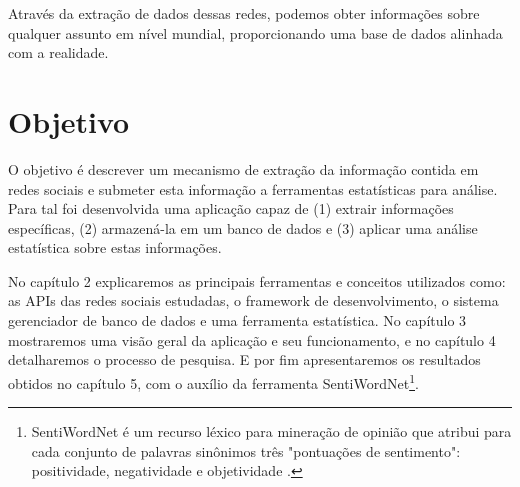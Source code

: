 Através da extração de dados dessas redes, podemos obter informações sobre qualquer assunto em nível mundial, proporcionando uma base de dados alinhada com a realidade.

\section{Objetivo}

O objetivo é descrever um mecanismo de extração da informação contida em redes sociais e submeter esta informação a ferramentas estatísticas para análise. Para tal foi desenvolvida uma aplicação capaz de (1) extrair informações específicas, (2) armazená-la em um banco de dados e (3) aplicar uma análise estatística sobre estas informações.

No capítulo 2 explicaremos as principais ferramentas e conceitos utilizados como: as APIs das redes sociais estudadas, o framework de desenvolvimento, o sistema gerenciador de banco de dados e uma ferramenta estatística.
No capítulo 3 mostraremos uma visão geral da aplicação e seu funcionamento, e no capítulo 4 detalharemos o processo de pesquisa. E por fim apresentaremos os resultados obtidos no capítulo 5, com o auxílio da ferramenta SentiWordNet\footnote{SentiWordNet é um recurso léxico para mineração de opinião que atribui para cada conjunto de palavras sinônimos três "pontuações de sentimento": positividade, negatividade e objetividade \cite{SentiWordNet}.}.





